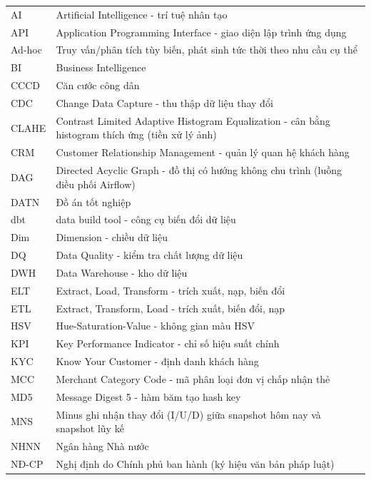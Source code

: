 \documentclass[oneside, a4paper]{book}
\theoremstyle{plain}
\theoremstyle{definition}
\theoremstyle{remark}
\begin{document}
\begin{longtable}{@{\hspace{-0.1cm}} l @{\hspace{1.2cm}} p{11.5cm}}
    AI    & Artificial Intelligence - trí tuệ nhân tạo\\
    API   & Application Programming Interface - giao diện lập trình ứng dụng\\
    Ad-hoc & Truy vấn/phân tích tùy biến, phát sinh tức thời theo nhu cầu cụ thể\\

    BI    & Business Intelligence \\
    CCCD  & Căn cước công dân\\
    CDC   & Change Data Capture - thu thập dữ liệu thay đổi\\
    CLAHE & Contrast Limited Adaptive Histogram Equalization - cân bằng histogram thích ứng (tiền xử lý ảnh)\\
    CRM   & Customer Relationship Management - quản lý quan hệ khách hàng\\
    DAG   & Directed Acyclic Graph - đồ thị có hướng không chu trình (luồng điều phối Airflow)\\
    DATN  & Đồ án tốt nghiệp\\
    dbt   & data build tool - công cụ biến đổi dữ liệu\\
    Dim   & Dimension - chiều dữ liệu\\
    DQ    & Data Quality - kiểm tra chất lượng dữ liệu\\
    DWH   & Data Warehouse - kho dữ liệu\\
    ELT   & Extract, Load, Transform - trích xuất, nạp, biến đổi\\
    ETL   & Extract, Transform, Load - trích xuất, biến đổi, nạp\\
    HSV   & Hue-Saturation-Value - không gian màu HSV\\
    KPI   & Key Performance Indicator - chỉ số hiệu suất chính\\
    KYC   & Know Your Customer - định danh khách hàng\\
    MCC   & Merchant Category Code - mã phân loại đơn vị chấp nhận thẻ\\
    MD5   & Message Digest 5 - hàm băm tạo hash key\\
    MNS   & Minus ghi nhận thay đổi (I/U/D) giữa snapshot hôm nay và snapshot lũy kế\\
    NHNN  & Ngân hàng Nhà nước\\
    NĐ-CP & Nghị định do Chính phủ ban hành (ký hiệu văn bản pháp luật)\\

\end{longtable}
\end{document}
